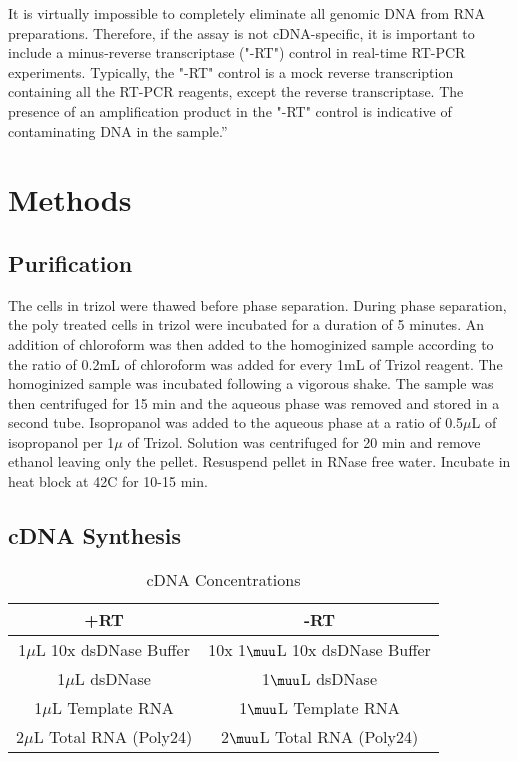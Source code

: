 \documentclass[journal, a4paper]{IEEEtran}
\begin{document}
It is virtually impossible to completely eliminate all genomic DNA from RNA preparations. Therefore, if the assay is not cDNA-specific, it is important to include a minus-reverse transcriptase ("-RT") control in real-time RT-PCR experiments. Typically, the "-RT" control is a mock reverse transcription containing all the RT-PCR reagents, except the reverse transcriptase. The presence of an amplification product in the "-RT" control is indicative of contaminating DNA in the sample.”

\section{Methods}
    \subsection{Purification}
      The cells in trizol were thawed before phase separation. During phase separation,
      the poly treated cells in trizol were incubated for a duration of 5 minutes. An addition of chloroform was then added
      to the homoginized sample according to the ratio of 0.2mL of chloroform was added for every 1mL of Trizol reagent.
      The homoginized sample was incubated following a vigorous shake. The sample was then centrifuged for 15 min and the aqueous phase
      was removed and stored in a second tube. Isopropanol was added to the aqueous phase at a ratio of 0.5$\mu$L of isopropanol per 1$\mu$ of Trizol.
      Solution was centrifuged for 20 min and remove ethanol leaving only the pellet. Resuspend pellet in RNase free water. Incubate in heat block at 42C for 10-15 min.

    \subsection{cDNA Synthesis}

        \begin{table}[!hbt]
          \begin{center}
          \caption{cDNA Concentrations}
          \label{tab:simParameters}
          \begin{tabular}{|c|c|}
            \hline
            +RT & -RT \\
            \hline
            1$\mu$L 10x dsDNase Buffer & 10x 1$\muu$L 10x dsDNase Buffer \\
            \hline
            1$\mu$L dsDNase & 1$\muu$L dsDNase \\
            \hline
            1$\mu$L Template RNA & 1$\muu$L Template RNA \\
            \hline
            2$\mu$L Total RNA (Poly24) & 2$\muu$L Total RNA (Poly24) \\
            \hline
          \end{tabular}
          \end{center}
        \end{table}
\end{document}
